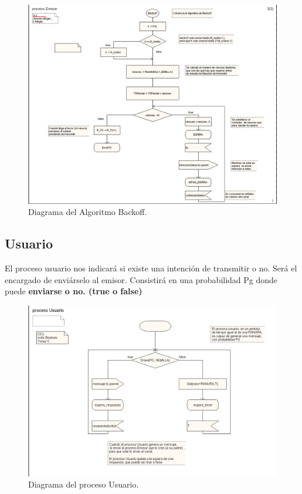 \documentclass{article}
\begin{document}
\begin{figure}[htb]
    \centering
    \includegraphics[width=0.85\linewidth]{src/backoff state.png}
    \caption{\label{fig:backoffstate} Diagrama del Algoritmo Backoff.}
\end{figure}

\quad

\subsection{Usuario}

El proceso usuario nos indicará si existe una intención de transmitir o no. Será el encargado de enviárselo al emisor. Consistirá en una probabilidad Pg donde puede \textbf{enviarse o no. (true o false)}

\quad

\begin{figure}[h]
    \centering
    \includegraphics[width=0.7\linewidth]{src/captura usuario.png}
    \caption{\label{fig:usuariodiagr} Diagrama del proceso Usuario.}
\end{figure}
\end{document}
